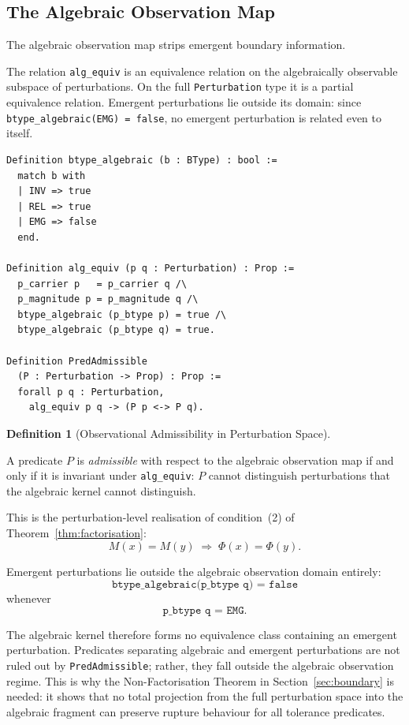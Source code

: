 \documentclass[pdflatex,sn-mathphys-num]{sn-jnl}
\theoremstyle{plain}
\theoremstyle{definition}
\newtheorem{definition}[theorem]{Definition}
\theoremstyle{remark}
\begin{document}
\subsection{The Algebraic Observation Map}

The algebraic observation map strips emergent boundary information.

The relation \texttt{alg\_equiv} is an equivalence relation on the
algebraically observable subspace of perturbations.
On the full \texttt{Perturbation} type it is a partial equivalence
relation.
Emergent perturbations lie outside its domain: since
\texttt{btype\_algebraic(EMG) = false}, no emergent perturbation is
related even to itself.

\begin{lstlisting}[style=rocq,
caption={Algebraic equivalence and predicate admissibility.}]
Definition btype_algebraic (b : BType) : bool :=
  match b with
  | INV => true
  | REL => true
  | EMG => false
  end.

Definition alg_equiv (p q : Perturbation) : Prop :=
  p_carrier p   = p_carrier q /\
  p_magnitude p = p_magnitude q /\
  btype_algebraic (p_btype p) = true /\
  btype_algebraic (p_btype q) = true.

Definition PredAdmissible
  (P : Perturbation -> Prop) : Prop :=
  forall p q : Perturbation,
    alg_equiv p q -> (P p <-> P q).
\end{lstlisting}

\begin{definition}[Observational Admissibility in Perturbation Space]
\label{def:pred-admissible}

A predicate $P$ is \emph{admissible} with respect to the algebraic
observation map if and only if it is invariant under
\texttt{alg\_equiv}: $P$ cannot distinguish perturbations that the
algebraic kernel cannot distinguish.

This is the perturbation-level realisation of condition~(2) of
Theorem~\ref{thm:factorisation}:
\[
M(x) = M(y)
\;\Rightarrow\;
\Phi(x) = \Phi(y).
\]

\end{definition}

Emergent perturbations lie outside the algebraic observation domain
entirely:
\[
\texttt{btype\_algebraic(p\_btype q) = false}
\]
whenever
\[
\texttt{p\_btype q = EMG}.
\]

The algebraic kernel therefore forms no equivalence class containing
an emergent perturbation.
Predicates separating algebraic and emergent perturbations are not ruled
out by \texttt{PredAdmissible}; rather, they fall outside the algebraic
observation regime.
This is why the Non-Factorisation Theorem in Section~\ref{sec:boundary}
is needed: it shows that no total projection from the full perturbation
space into the algebraic fragment can preserve rupture behaviour for all
tolerance predicates.
\end{document}
